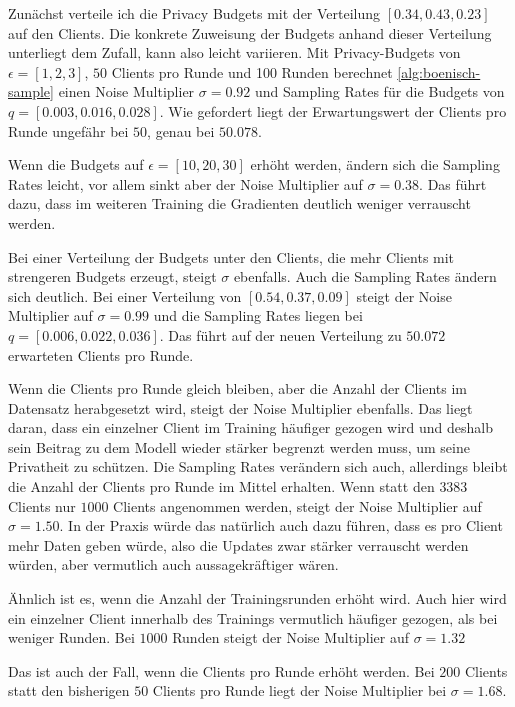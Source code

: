 Zunächst verteile ich die Privacy Budgets mit der Verteilung $[0.34, 0.43, 0.23]$ auf den Clients. Die konkrete Zuweisung der Budgets anhand dieser Verteilung unterliegt dem Zufall, kann also leicht variieren. Mit Privacy-Budgets von $\epsilon = [1,2,3]$, $50$ Clients pro Runde und 100 Runden berechnet \autoref{alg:boenisch-sample} einen Noise Multiplier $\sigma = 0.92$ und Sampling Rates für die Budgets von $q = [0.003, 0.016, 0.028]$. Wie gefordert liegt der Erwartungswert der Clients pro Runde ungefähr bei $50$, genau bei $50.078$.

Wenn die Budgets auf $\epsilon = [10, 20, 30]$ erhöht werden, ändern sich die Sampling Rates leicht, vor allem sinkt aber der Noise Multiplier auf $\sigma = 0.38$. Das führt dazu, dass im weiteren Training die Gradienten deutlich weniger verrauscht werden.

Bei einer Verteilung der Budgets unter den Clients, die mehr Clients mit strengeren Budgets erzeugt, steigt $\sigma$ ebenfalls. Auch die Sampling Rates ändern sich deutlich. Bei einer Verteilung von $[0.54, 0.37, 0.09]$ steigt der Noise Multiplier auf $\sigma = 0.99$ und die Sampling Rates liegen bei $q = [0.006, 0.022, 0.036]$. Das führt auf der neuen Verteilung zu $50.072$ erwarteten Clients pro Runde.

Wenn die Clients pro Runde gleich bleiben, aber die Anzahl der Clients im Datensatz herabgesetzt wird, steigt der Noise Multiplier ebenfalls. Das liegt daran, dass ein einzelner Client im Training häufiger gezogen wird und deshalb sein Beitrag zu dem Modell wieder stärker begrenzt werden muss, um seine Privatheit zu schützen. Die Sampling Rates verändern sich auch, allerdings bleibt die Anzahl der Clients pro Runde im Mittel erhalten. Wenn statt den $3383$ Clients nur $1000$ Clients angenommen werden, steigt der Noise Multiplier auf $\sigma = 1.50$. In der Praxis würde das natürlich auch dazu führen, dass es pro Client mehr Daten geben würde, also die Updates zwar stärker verrauscht werden würden, aber vermutlich auch aussagekräftiger wären.

Ähnlich ist es, wenn die Anzahl der Trainingsrunden erhöht wird. Auch hier wird ein einzelner Client innerhalb des Trainings vermutlich häufiger gezogen, als bei weniger Runden. Bei $1000$ Runden steigt der Noise Multiplier auf $\sigma = 1.32$

Das ist auch der Fall, wenn die Clients pro Runde erhöht werden. Bei $200$ Clients statt den bisherigen $50$ Clients pro Runde liegt der Noise Multiplier bei $\sigma = 1.68$.

